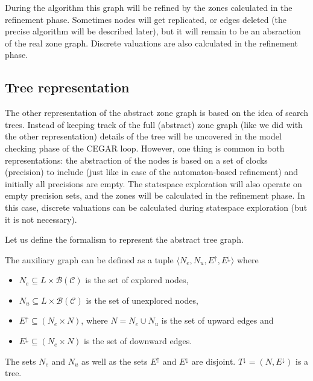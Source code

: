 
During the algorithm this graph will be refined by the zones calculated in the refinement phase. Sometimes nodes will get replicated, or edges deleted (the precise algorithm will be described later), but it will remain to be an absraction of the real zone graph. Discrete valuations are also calculated in the refinement phase.


 

\subsection{Tree representation}
The other representation of the abstract zone graph is based on the idea of search trees. Instead of keeping track of the full (abstract) zone graph (like we did with the other representation) details of the tree will be uncovered in the model checking phase of the CEGAR loop. However, one thing is common in both representations:  the abstraction of the nodes is based on a set of clocks (precision) to include (just like in case of the automaton-based refinement) and initially all precisions are empty. The statespace exploration will also operate on empty precision sets, and the zones will be calculated in the refinement phase. In this case, discrete valuations can be calculated during statespace exploration (but it is not necessary).

Let us define the formalism to represent the abstract tree graph.

\begin{dfn}
	The auxiliary graph can be defined as a tuple $\langle N_e, N_u, E^\uparrow, E^\downarrow \rangle$ where
	\begin{itemize}
		\item $N_e \subseteq L \times \mathcal{B}(\mathcal{C})$ is the set of explored nodes,
		\item $N_u \subseteq L \times \mathcal{B}(\mathcal{C})$  is the set of unexplored nodes,
		\item $E^\uparrow \subseteq (N_e \times N)$, where $N = N_e \cup N_u$ is the set of upward edges and
		\item $E^\downarrow \subseteq (N_e \times N)$  is the set of downward edges.
	\end{itemize}
	 The sets $N_e$ and $N_u$ as well as the sets $E^\uparrow$ and $E^\downarrow$ are disjoint. $T^\downarrow=(N,E^\downarrow)$ is a tree.
\end{dfn}
 

